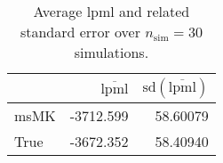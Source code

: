 \begin{table}[H]

\caption{Average lpml and related standard error over $n_{\text{sim}} = 30$ simulations.}
\centering
\begin{tabular}[t]{lrr}
\toprule
  & $\overbar{\text{lpml}}$ & $\text{sd}(\overbar{\text{lpml}})$\\
\midrule
msMK & -3712.599 & 58.60079\\
True & -3672.352 & 58.40940\\
\bottomrule
\end{tabular}
\end{table}